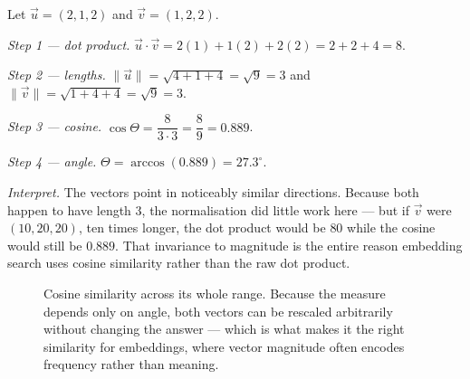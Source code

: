 \begin{workedexample}
Let $\vec{u} = (2,1,2)$ and $\vec{v} = (1,2,2)$.

\emph{Step 1 --- dot product.}
$\vec{u}\cdot\vec{v} = 2(1) + 1(2) + 2(2) = 2+2+4 = 8$.

\emph{Step 2 --- lengths.}
$\lVert\vec{u}\rVert = \sqrt{4+1+4} = \sqrt{9} = 3$ and
$\lVert\vec{v}\rVert = \sqrt{1+4+4} = \sqrt{9} = 3$.

\emph{Step 3 --- cosine.}
$\cos\Theta = \dfrac{8}{3\cdot3} = \dfrac{8}{9} = 0.889$.

\emph{Step 4 --- angle.}
$\Theta = \arccos(0.889) = 27.3^\circ$.

\emph{Interpret.} The vectors point in noticeably similar directions. Because
both happen to have length $3$, the normalisation did little work here --- but
if $\vec{v}$ were $(10,20,20)$, ten times longer, the dot product would be $80$
while the cosine would still be $0.889$. That invariance to magnitude is the
entire reason embedding search uses cosine similarity rather than the raw dot
product.
\end{workedexample}

\begin{figure}[htbp]
\centering
{}
\caption{Cosine similarity across its whole range. Because the measure depends
only on angle, both vectors can be rescaled arbitrarily without changing the
answer --- which is what makes it the right similarity for embeddings, where
vector magnitude often encodes frequency rather than meaning.}
\label{fig:math-cosine-similarity}
\end{figure}

